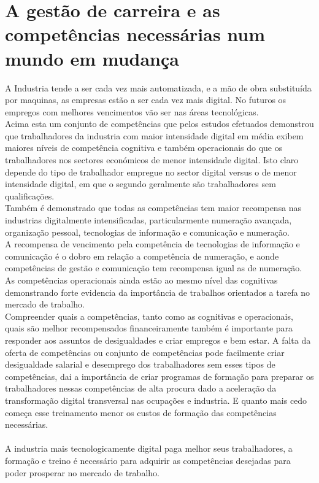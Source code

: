 \section{A gestão de carreira e as competências necessárias num mundo em mudança}
\qquad A Industria tende a ser cada vez mais automatizada, e a mão de obra substituída por maquinas, as empresas estão a ser cada vez mais digital.
\emptyline
No futuros os empregos com melhores vencimentos vão ser nas áreas tecnológicas.\\

Acima esta um conjunto de competências que pelos estudos efetuados demonstrou que trabalhadores da industria com maior intensidade digital em média exibem maiores níveis de competência cognitiva e também operacionais do que os trabalhadores nos sectores económicos de menor intensidade digital. Isto claro depende do tipo de trabalhador empregue no sector digital versus o de menor intensidade digital, em que o segundo geralmente são trabalhadores sem qualificações. \cite{article-1}\\
Também é demonstrado que todas as competências tem maior recompensa nas industrias digitalmente intensificadas, particularmente numeração avançada, organização pessoal, tecnologias de informação e comunicação e numeração. \cite{article-1}\\
A recompensa de vencimento pela competência de tecnologias de informação e comunicação é o dobro em relação a competência de numeração, e aonde competências de gestão e comunicação tem recompensa igual as de numeração. \cite{article-1}\\
As competências operacionais ainda estão ao mesmo nível das cognitivas demonstrando forte evidencia da importância de trabalhos orientados a tarefa no mercado de trabalho. \cite{article-1}\\
Compreender quais a competências, tanto como as cognitivas e operacionais, quais são melhor recompensados financeiramente também é importante para responder aos assuntos de  desigualdades e criar empregos e bem estar. A falta da oferta de competências ou conjunto de competências pode facilmente criar desigualdade salarial e desemprego dos trabalhadores sem esses tipos de competências, dai a importância de criar programas de formação para preparar os trabalhadores nessas competências de alta procura dado a aceleração da transformação digital transversal nas ocupações e industria. E quanto mais cedo começa esse treinamento menor os custos de formação das competências necessárias. \cite{article-1}\\
\\
A industria mais tecnologicamente digital paga melhor seus trabalhadores, a formação e treino é necessário para adquirir as competências desejadas para poder prosperar no mercado de trabalho.

